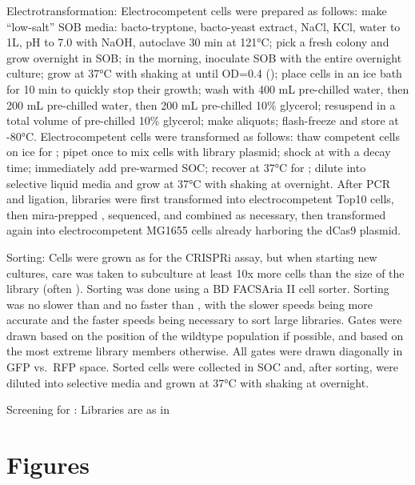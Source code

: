 \documentclass[10pt,oneside]{article}
\begin{document}
Electrotransformation: Electrocompetent cells were prepared as follows: make 
``low-salt'' SOB media:  bacto-tryptone,  bacto-yeast extract, 
  NaCl,   KCl, water to 1L, pH to 7.0 with 
NaOH, autoclave 30 min at 121°C; pick a fresh colony and grow overnight in 
 SOB; in the morning, inoculate  SOB with the entire overnight 
culture; grow at 37°C with shaking at  until OD=0.4 (); place 
cells in an ice bath for 10 min to quickly stop their growth; wash with 400 mL 
pre-chilled water, then 200 mL pre-chilled water, then 200 mL pre-chilled 10\% 
glycerol; resuspend in a total volume of  pre-chilled 10\% glycerol; make 
 aliquots; flash-freeze and store at -80°C.  Electrocompetent cells 
were transformed as follows: thaw competent cells on ice for ; pipet 
once to mix cells with   library plasmid; shock at 
with a  decay time; immediately add  pre-warmed SOC; recover at 
37°C for ; dilute into selective liquid media and grow at 37°C with 
shaking at  overnight.  After PCR and ligation, libraries were first 
transformed into electrocompetent Top10 cells, then mira-prepped 
\autocite{pronobis2016}, sequenced, and combined as necessary, then transformed 
again into electrocompetent MG1655 cells already harboring the dCas9 plasmid.

Sorting: Cells were grown as for the CRISPRi assay, but when starting new  
cultures, care was taken to subculture at least 10x more cells than the size of 
the library (often ).  Sorting was done using a BD FACSAria II cell 
sorter.  Sorting was no slower than  and no faster than 
, with the slower speeds being more accurate and the faster speeds 
being necessary to sort large libraries.  Gates were drawn based on the 
position of the wildtype population if possible, and based on the most extreme 
library members otherwise.  All gates were drawn diagonally in GFP vs.\ RFP 
space.  Sorted cells were collected in  SOC and, after sorting, were 
diluted into selective media and grown at 37°C with shaking at  
overnight.

Screening for \ligrnaB{}: Libraries are as in 

\section{Figures}

\end{document}
